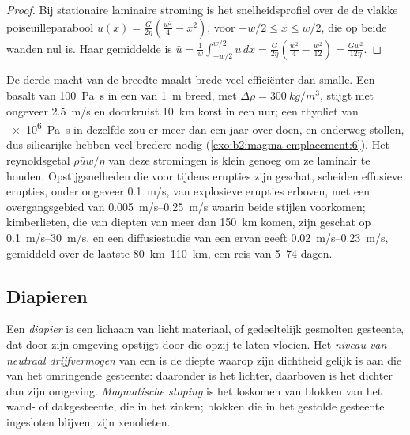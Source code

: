 \begin{proof}
Bij stationaire laminaire stroming is het snelheidsprofiel over de  de vlakke
poiseuilleparabool $u(x) = \frac{G}{2\eta}\left(\frac{w^2}{4} - x^2\right)$, voor
$-w/2 \le x \le w/2$, die op beide wanden nul is. Haar gemiddelde is
$\bar u = \frac1w\int_{-w/2}^{w/2}u\,dx = \frac{G}{2\eta}\left(\frac{w^2}{4} -
\frac{w^2}{12}\right) = \frac{Gw^2}{12\eta}$.
\end{proof}

De derde macht van de breedte maakt brede  veel efficiënter dan smalle. Een
basalt van \qty{100}{Pa.s} in een  van \qty{1}{m} breed, met $\Delta\rho =
\qty{300}{kg/m^3}$, stijgt met ongeveer \qty{2.5}{m/s} en doorkruist \qty{10}{km}
korst in een uur; een rhyoliet van \qty{e6}{Pa.s} in dezelfde  zou er meer
dan een jaar over doen, en onderweg stollen, dus silicarijke  hebben veel bredere
 nodig (\cref{exo:b2:magma-emplacement:6}). Het reynoldsgetal $\rho\bar u w/\eta$ van deze stromingen
is klein genoeg om ze laminair te houden. Opstijgsnelheden die voor 
tijdens erupties zijn geschat, scheiden effusieve erupties, onder ongeveer \qty{0.1}{m/s}, van
explosieve erupties erboven, met een overgangsgebied van \qtyrange{0.005}{0.25}{m/s}
waarin beide stijlen voorkomen; kimberlieten, die van
diepten van meer dan \qty{150}{km} komen, zijn geschat op \qtyrange{0.1}{30}{m/s}, en
een diffusiestudie van een ervan geeft \qtyrange{0.02}{0.23}{m/s}, gemiddeld over
de laatste \qtyrange{80}{110}{km}, een reis van \numrange{5}{74} dagen.

\subsection{Diapieren}

\begin{definition}\label{def:b2:magma-emplacement:ascent}
Een \emph{diapier} is een lichaam van licht materiaal,  of gedeeltelijk gesmolten
gesteente, dat door zijn omgeving opstijgt door die opzij te laten vloeien. Het
\emph{niveau van neutraal drijfvermogen} van een  is de
diepte waarop zijn dichtheid gelijk is aan die van het omringende gesteente: daaronder is het
 lichter, daarboven is het dichter dan zijn omgeving. \emph{Magmatische
stoping} is het loskomen van blokken van het wand- of
dakgesteente, die in het  zinken; blokken die in het gestolde
gesteente ingesloten blijven, zijn xenolieten.
\end{definition}

